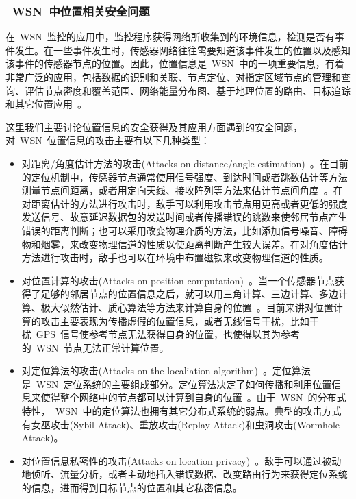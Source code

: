 \documentclass[a4paper,10pt]{article}
\begin{document}
\subsubsection{~WSN~中位置相关安全问题}  

在~WSN~监控的应用中，监控程序获得网络所收集到的环境信息，检测是否有事件发生。在一些事件发生时，传感器网络往往需要知道该事件发生的位置以及感知该事件的传感器节点的位置。因此，位置信息是~WSN~中的一项重要信息，有着非常广泛的应用，包括数据的识别和关联、节点定位、对指定区域节点的管理和查询、评估节点密度和覆盖范围、网络能量分布图、基于地理位置的路由、目标追踪和其它位置应用~\cite{Boukerche2007a,Yick2008}。

这里我们主要讨论位置信息的安全获得及其应用方面遇到的安全问题，对~WSN~位置信息的攻击主要有以下几种类型：

\begin{itemize}

\item 对距离/角度估计方法的攻击(Attacks on distance/angle estimation)~\cite{Boukerche2008}。在目前的定位机制中，传感器节点通常使用信号强度、到达时间或者跳数估计等方法测量节点间距离，或者用定向天线、接收阵列等方法来估计节点间角度~\cite{Boukerche2007a}。在对距离估计的方法进行攻击时，敌手可以利用攻击节点用更高或者更低的强度发送信号、故意延迟数据包的发送时间或者传播错误的跳数来使邻居节点产生错误的距离判断；也可以采用改变物理介质的方法，比如添加信号噪音、障碍物和烟雾，来改变物理信道的性质以使距离判断产生较大误差。在对角度估计方法进行攻击时，敌手也可以在环境中布置磁铁来改变物理信道的性质。

\item 对位置计算的攻击(Attacks on position computation)~\cite{Boukerche2008}。当一个传感器节点获得了足够的邻居节点的位置信息之后，就可以用三角计算、三边计算、多边计算、极大似然估计、质心算法等方法来计算自身的位置~\cite{Boukerche2007a}。目前来讲对位置计算的攻击主要表现为传播虚假的位置信息，或者无线信号干扰，比如干扰~GPS~信号使参考节点无法获得自身的位置，也使得以其为参考的~WSN~节点无法正常计算位置。

\item 对定位算法的攻击(Attacks on the localiation algorithm)~\cite{Boukerche2008}。定位算法是~WSN~定位系统的主要组成部分。定位算法决定了如何传播和利用位置信息来使得整个网络中的节点都可以计算到自身的位置~\cite{Boukerche2007a}。由于~WSN~的分布式特性，~WSN~中的定位算法也拥有其它分布式系统的弱点。典型的攻击方式有女巫攻击(Sybil Attack)、重放攻击(Replay Attack)和虫洞攻击(Wormhole Attack)。

\item 对位置信息私密性的攻击(Attacks on location privacy)~\cite{Gruteser2003}。敌手可以通过被动地侦听、流量分析，或者主动地插入错误数据、改变路由行为来获得定位系统的信息，进而得到目标节点的位置和其它私密信息。

\end{itemize}
\end{document}
